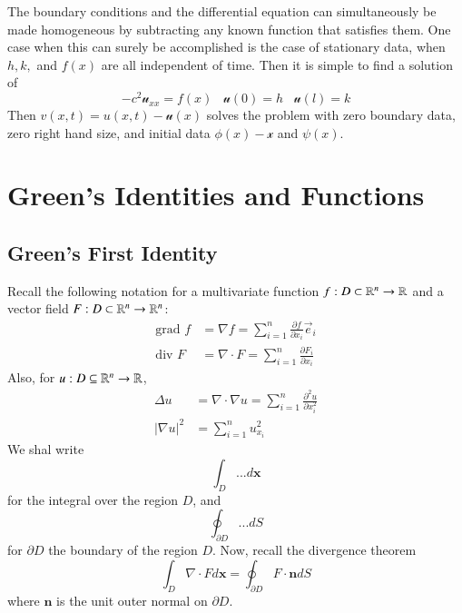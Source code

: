\documentclass[12pt, a4paper, oneside, openright, titlepage]{book}
\begin{document}
The boundary conditions and the differential equation can simultaneously be made homogeneous by subtracting any known function that satisfies them. One case when this can surely be accomplished is the case of stationary data, when $h,k,$ and $f(x)$ are all independent of time. Then it is simple to find a solution of \begin{equation*}
    -c^2\mathscr{u}_{xx} = f(x)\;\;\;\mathscr{u}(0) = h\;\;\;\mathscr{u}(l) = k
\end{equation*}
Then $v(x,t) = u(x,t) - \mathscr{u}(x)$ solves the problem with zero boundary data, zero right hand size, and initial data $\phi(x) - \mathscr{x}$ and $\psi(x)$.





\chapter{Green's Identities and Functions}

\section{Green's First Identity}

Recall the following notation for a multivariate function $f:D\subset \mathbb R^n\rightarrow \mathbb R$ and a vector field $F:D\subset\mathbb R^n\rightarrow \mathbb R^n$: \begin{align*}
    \text{grad }f &= \nabla f = \sum_{i=1}^n\frac{\partial f}{\partial x_i}\vec{e}_i \\
    \text{div }F &= \nabla \cdot F = \sum_{i=1}^n\frac{\partial F_i}{\partial x_i}
\end{align*}
Also, for $u:D\subseteq \mathbb R^n\rightarrow \mathbb R$, \begin{align*}
    \Delta u &= \nabla\cdot \nabla u = \sum_{i=1}^n\frac{\partial^2 u}{\partial x_i^2} \\
    |\nabla u|^2 &= \sum_{i=1}^nu_{x_i}^2
\end{align*}
We shal write \begin{equation*}
    \int_D...d\mathbf{x}
\end{equation*}
for the integral over the region $D$, and \begin{equation*}
    \oint_{\partial D}...dS
\end{equation*}
for $\partial D$ the boundary of the region $D$. Now, recall the divergence theorem \begin{equation}
    \boxed{\int_D\nabla \cdot Fd\mathbf{x} = \oint_{\partial D}F\cdot \mathbf{n}dS}
\end{equation}
where $\mathbf{n}$ is the unit outer normal on $\partial D$.
\end{document}
